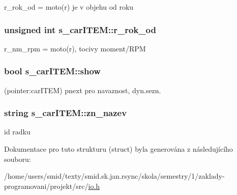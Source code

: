 r\-\_\-rok\-\_\-od = moto(r) je v objehu od roku 

\hypertarget{structs__carITEM_a13180f6d951508be29c8612bdb88229e}{
\subsubsection[{r\-\_\-rok\-\_\-od}]{\setlength{\rightskip}{0pt plus 5cm}unsigned int {\bf s\-\_\-car\-I\-T\-E\-M\-::r\-\_\-rok\-\_\-od}}}
\label{d7/da8/structs__carITEM_a13180f6d951508be29c8612bdb88229e}


r\-\_\-nm\-\_\-rpm = moto(r), tocivy moment/\-R\-P\-M 

\hypertarget{structs__carITEM_a687529357a76cad13a85d8bbffc092be}{
\subsubsection[{show}]{\setlength{\rightskip}{0pt plus 5cm}bool {\bf s\-\_\-car\-I\-T\-E\-M\-::show}}}
\label{d7/da8/structs__carITEM_a687529357a76cad13a85d8bbffc092be}


(pointer\-:car\-I\-T\-E\-M) pnext pro navaznost, dyn.\-sezn. 

\hypertarget{structs__carITEM_a0645a77c08276a5d14a7d21f5e0f21de}{
\subsubsection[{zn\-\_\-nazev}]{\setlength{\rightskip}{0pt plus 5cm}string {\bf s\-\_\-car\-I\-T\-E\-M\-::zn\-\_\-nazev}}}
\label{d7/da8/structs__carITEM_a0645a77c08276a5d14a7d21f5e0f21de}


id radku 



\-Dokumentace pro tuto strukturu (struct) byla generována z následujícího souboru\-:\begin{DoxyCompactItemize}
\item 
/home/users/smid/texty/smid.\-sk.\-jan.\-rsync/skola/semestry/1/zaklady-\/programovani/projekt/src/\hyperlink{io_8h}{io.\-h}\end{DoxyCompactItemize}
